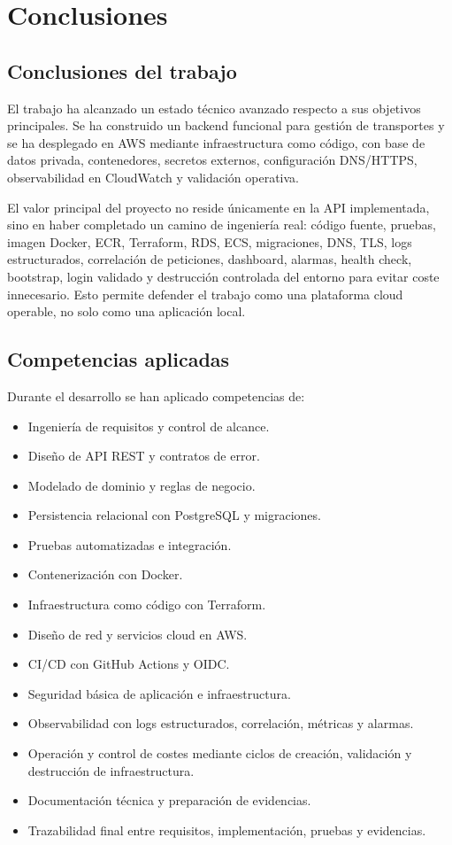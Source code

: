 \chapter{Conclusiones}
\label{chap:conclusions}

\section{Conclusiones del trabajo}
\label{sec:conclusiones-trabajo}

El trabajo ha alcanzado un estado técnico avanzado respecto a sus objetivos principales. Se ha construido un backend funcional para gestión de transportes y se ha desplegado en AWS mediante infraestructura como código, con base de datos privada, contenedores, secretos externos, configuración DNS/HTTPS, observabilidad en CloudWatch y validación operativa.

El valor principal del proyecto no reside únicamente en la API implementada, sino en haber completado un camino de ingeniería real: código fuente, pruebas, imagen Docker, ECR, Terraform, RDS, ECS, migraciones, DNS, TLS, logs estructurados, correlación de peticiones, dashboard, alarmas, health check, bootstrap, login validado y destrucción controlada del entorno para evitar coste innecesario. Esto permite defender el trabajo como una plataforma cloud operable, no solo como una aplicación local.

\section{Competencias aplicadas}
\label{sec:competencias-aplicadas}

Durante el desarrollo se han aplicado competencias de:

\begin{itemize}
  \item Ingeniería de requisitos y control de alcance.
  \item Diseño de API REST y contratos de error.
  \item Modelado de dominio y reglas de negocio.
  \item Persistencia relacional con PostgreSQL y migraciones.
  \item Pruebas automatizadas e integración.
  \item Contenerización con Docker.
  \item Infraestructura como código con Terraform.
  \item Diseño de red y servicios cloud en AWS.
  \item CI/CD con GitHub Actions y OIDC.
  \item Seguridad básica de aplicación e infraestructura.
  \item Observabilidad con logs estructurados, correlación, métricas y alarmas.
  \item Operación y control de costes mediante ciclos de creación, validación y destrucción de infraestructura.
  \item Documentación técnica y preparación de evidencias.
  \item Trazabilidad final entre requisitos, implementación, pruebas y evidencias.
\end{itemize}

